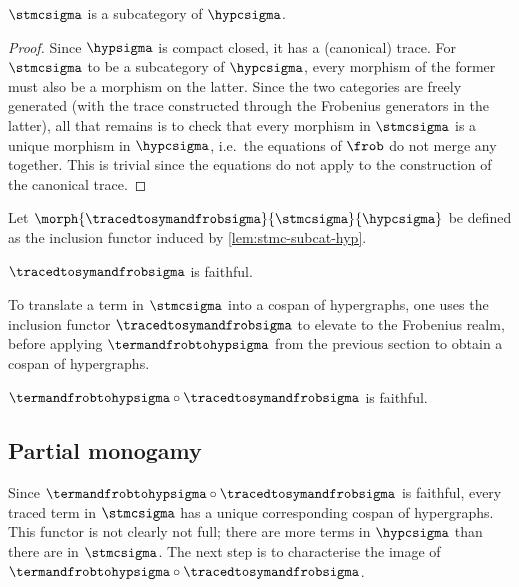 \begin{lemma}
    \label{lem:stmc-subcat-hyp}
    \(\stmcsigma\) is a subcategory of \(\hypcsigma\).
\end{lemma}
\begin{proof}
    Since \(\hypsigma\) is compact closed, it has a (canonical) trace.
    For \(\stmcsigma\) to be a subcategory of \(\hypcsigma\), every morphism
    of the former must also be a morphism on the latter.
    Since the two categories are freely generated (with the trace constructed
    through the Frobenius generators in the latter), all that remains is to
    check that every morphism in \(\stmcsigma\) is a unique morphism in
    \(\hypcsigma\), i.e.\ the equations of \(\frob\) do not merge any together.
    This is trivial since the equations do not apply to the construction of the
    canonical trace.
\end{proof}

\begin{definition}
    Let \(\morph{\tracedtosymandfrobsigma}{\stmcsigma}{\hypcsigma}\) be defined
    as the inclusion functor induced by \cref{lem:stmc-subcat-hyp}.
\end{definition}

\begin{corollary}
    \(\tracedtosymandfrobsigma\) is faithful.
\end{corollary}

To translate a term in \(\stmcsigma\) into a cospan of hypergraphs, one uses
the inclusion functor \(\tracedtosymandfrobsigma\) to elevate to the
Frobenius realm, before applying \(\termandfrobtohypsigma\) from the previous
section to obtain a cospan of hypergraphs.

\begin{corollary}
    \(\termandfrobtohypsigma \circ \tracedtosymandfrobsigma\) is faithful.
\end{corollary}

\subsection{Partial monogamy}

Since \(\termandfrobtohypsigma \circ \tracedtosymandfrobsigma\) is faithful,
every traced term in \(\stmcsigma\) has a unique corresponding cospan of
hypergraphs.
This functor is not clearly not full; there are more terms in
\(\hypcsigma\) than there are in \(\stmcsigma\).
The next step is to characterise the image of
\(\termandfrobtohypsigma \circ \tracedtosymandfrobsigma\).

